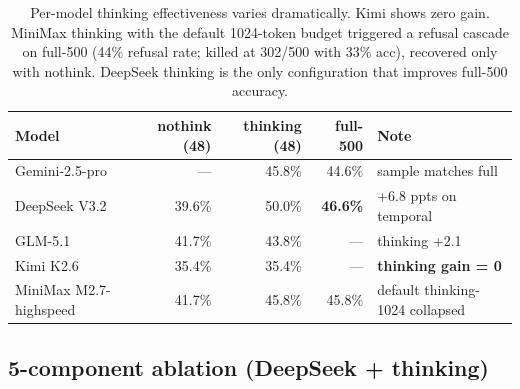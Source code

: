 \begin{table}[h]
\centering
\small
\begin{tabular}{lrrrl}
\toprule
\textbf{Model} & \textbf{nothink (48)} & \textbf{thinking (48)} & \textbf{full-500} & \textbf{Note} \\
\midrule
Gemini-2.5-pro & --- & 45.8\% & 44.6\% & sample matches full \\
DeepSeek V3.2 & 39.6\% & 50.0\% & \textbf{46.6\%} & +6.8 ppts on temporal \\
GLM-5.1 & 41.7\% & 43.8\% & --- & thinking +2.1 \\
Kimi K2.6 & 35.4\% & 35.4\% & --- & \textbf{thinking gain = 0} \\
MiniMax M2.7-highspeed & 41.7\% & 45.8\% & 45.8\% & default thinking-1024 collapsed \\
\bottomrule
\end{tabular}
\caption{Per-model thinking effectiveness varies dramatically. Kimi shows
zero gain. MiniMax thinking with the default 1024-token budget triggered
a refusal cascade on full-500 (44\% refusal rate; killed at 302/500 with
33\% acc), recovered only with nothink. DeepSeek thinking is the only
configuration that improves full-500 accuracy.}
\label{tab:thinking-ablation}
\end{table}

\subsection{5-component ablation (DeepSeek + thinking)}

